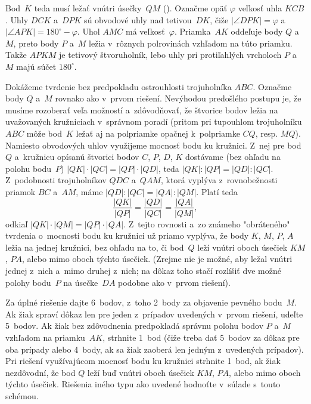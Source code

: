 {Bod~$K$ teda musí ležať vnútri úsečky~$QM$ (\obr). Označme opäť $\varphi$ veľkosť uhla $KCB$. Uhly $DCK$ a~$DPK$ sú obvodové uhly nad tetivou~$DK$, čiže $|\angle DPK|=\varphi$ a~$|\angle APK|=180^\circ-\varphi$. Uhol $AMC$ má veľkosť~$\varphi$. Priamka~$AK$ oddeľuje body $Q$ a~$M$, preto body $P$ a~$M$ ležia v~rôznych polrovinách vzhľadom na túto priamku. Takže $APKM$ je tetivový štvoruholník, lebo uhly pri protiľahlých vrcholoch $P$ a~$M$ majú súčet $180^\circ$.
%

\ineriesenie
Dokážeme tvrdenie bez predpokladu ostrouhlosti trojuholníka $ABC$. Označme body $Q$ a~$M$ rovnako ako v~prvom riešení. Nevýhodou predošlého postupu je, že musíme rozoberať veľa možností a~zdôvodňovať, že štvorice bodov ležia na uvažovaných kružniciach v~správnom poradí (pritom pri tupouhlom trojuholníku $ABC$ môže bod~$K$ ležať aj na polpriamke opačnej k~polpriamke $CQ$, resp. $MQ$). Namiesto obvodových uhlov využijeme mocnosť bodu ku kružnici. Z~nej pre bod~$Q$ a~kružnicu opísanú štvorici bodov $C$, $P$, $D$, $K$ dostávame (bez ohľadu na polohu bodu~$P$) $|QK|\cdot|QC|=|QP|\cdot|QD|$, teda $|QK|:|QP|=|QD|:|QC|$. Z~podobnosti trojuholníkov $QDC$ a~$QAM$, ktorá vyplýva z~rovnobežnosti priamok $BC$ a~$AM$, máme $|QD|:|QC|=|QA|:|QM|$. Platí teda
$$
\frac{|QK|}{|QP|}=\frac{|QD|}{|QC|}=\frac{|QA|}{|QM|},
$$
odkiaľ $|QK|\cdot|QM|=|QP|\cdot|QA|$. Z~tejto rovnosti a~zo známeho "obráteného" tvrdenia o~mocnosti bodu ku kružnici už priamo vyplýva, že body $K$, $M$, $P$, $A$ ležia na jednej kružnici, bez ohľadu na to, či bod~$Q$ leží vnútri oboch úsečiek $KM$, $PA$, alebo mimo oboch týchto úsečiek. (Zrejme nie je možné, aby ležal vnútri jednej z~nich a~mimo druhej z~nich; na dôkaz toho stačí rozlíšiť dve možné polohy bodu~$P$ na úsečke~$DA$ podobne ako v~prvom riešení).

\nobreak\medskip\petit\noindent
Za úplné riešenie dajte 6~bodov, z~toho 2~body za objavenie pevného bodu~$M$. Ak žiak spraví dôkaz len pre jeden z~prípadov uvedených v~prvom riešení, udeľte 5~bodov. Ak žiak bez zdôvodnenia predpokladá správnu polohu bodov $P$ a~$M$ vzhľadom na priamku~$AK$, strhnite 1~bod (čiže treba dať 5~bodov za dôkaz pre oba prípady alebo 4~body, ak sa žiak zaoberá len jedným z~uvedených prípadov). Pri riešení využívajúcom mocnosť bodu ku kružnici strhnite 1~bod, ak žiak nezdôvodní, že bod $Q$ leží buď vnútri oboch úsečiek $KM$, $PA$, alebo mimo oboch týchto úsečiek. Riešenia iného typu ako uvedené hodnoťte v~súlade s~touto schémou.
\endpetit
\bigbreak}

